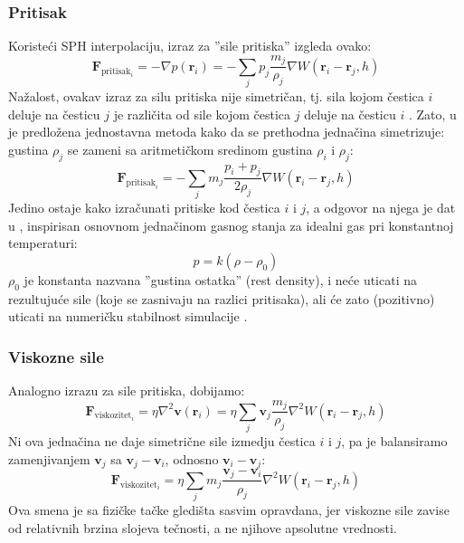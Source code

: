 \documentclass[12pt]{article}
\renewcommand{\vec}[1]{\mathbf{#1}}
\begin{document}
        \subsubsection{Pritisak}
            Koriste\'ci SPH interpolaciju, izraz za ''sile pritiska'' izgleda ovako:
            $$\vec{F}_{\text{pritisak}_i} = -\nabla p(\vec{r}_i)=-\sum_j p_j \frac{m_j}{\rho_j}\nabla W(\vec{r}_i-\vec{r}_j, h)$$
            Na\v zalost, ovakav izraz za silu pritiska nije simetri\v can, tj. sila kojom \v cestica $i$ deluje na \v cesticu $j$ je razli\v cita od sile kojom \v cestica $j$ deluje na \v cesticu $i$ . Zato, u \cite{Desbrun96smoothedparticles:} je predlo\v zena jednostavna metoda kako da se prethodna jedna\v cina simetrizuje: gustina $\rho_j$ se zameni sa aritmeti\v ckom sredinom gustina $\rho_i$ i $\rho_j$:
            $$\vec{F}_{\text{pritisak}_i} = -\sum_j m_j \frac{p_i+p_j}{2\rho_j}\nabla W(\vec{r}_i-\vec{r}_j, h)$$
            Jedino ostaje kako izra\v cunati pritiske kod \v cestica $i$ i $j$, a odgovor na njega je dat u \cite{Muller:2003:PFS:846276.846298}, inspirisan osnovnom jedna\v cinom gasnog stanja za idealni gas pri konstantnoj temperaturi:
            $$p = k(\rho-\rho_0)$$
            $\rho_0$ je konstanta nazvana ''gustina ostatka'' (rest density), i ne\'ce uticati na rezultuju\'ce sile (koje se zasnivaju na razlici pritisaka), ali \'ce zato (pozitivno) uticati na numeri\v cku stabilnost simulacije \cite{Muller:2003:PFS:846276.846298}.
        \subsubsection{Viskozne sile}
            Analogno izrazu za sile pritiska, dobijamo:
            $$\vec{F}_{\text{viskozitet}_i} = \eta\nabla^2 \vec{v}(\vec{r}_i)=\eta\sum_j \vec{v}_j \frac{m_j}{\rho_j}\nabla^2 W(\vec{r}_i-\vec{r}_j, h)$$
            Ni ova jedna\v cina ne daje simetri\v cne sile izmedju \v cestica $i$ i $j$, pa je balansiramo zamenjivanjem $\vec{v}_j$ sa $\vec{v}_j-\vec{v}_i$, odnosno $\vec{v}_i-\vec{v}_j$:
            $$\vec{F}_{\text{viskozitet}_i}=\eta\sum_j m_j \frac{\vec{v}_j-\vec{v}_i}{\rho_j}\nabla^2 W(\vec{r}_i-\vec{r}_j, h)$$
            Ova smena je sa fizi\v cke ta\v cke gledi\v sta sasvim opravdana, jer viskozne sile zavise od relativnih brzina slojeva te\v cnosti, a ne njihove apsolutne vrednosti.
\end{document}
